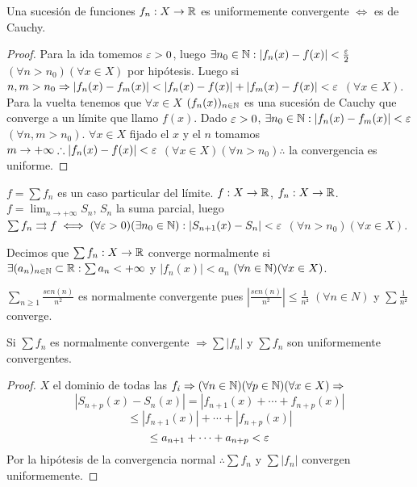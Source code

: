\begin{theorem}
  Una sucesión de funciones $f_n : X \to \mathbb{R}$ es uniformemente convergente $\iff$ es de Cauchy.
  \begin{proof}
    Para la ida tomemos $\varepsilon > 0$, luego $\exists n_0 \in \mathbb{N} : |f_n(x) - f(x)| < \frac{\varepsilon}{2}$ $(\forall n > n_0)(\forall x \in X)$ por hipótesis. Luego si $n, m > n_0 \Rightarrow |f_n(x) - f_m(x)| < |f_n(x) - f(x)| + |f_m(x) - f(x)| < \varepsilon$ $(\forall x \in X)$. \\
    Para la vuelta tenemos que $\forall x \in X$ $(f_n(x))_{n \in \mathbb{N}}$ es una sucesión de Cauchy que converge a un límite que llamo $f(x)$. Dado $\varepsilon > 0$, $\exists n_0 \in \mathbb{N} : |f_n(x) - f_m(x)| < \varepsilon$ $(\forall n, m > n_0)$. $\forall x \in X$ fijado el $x$ y el $n$ tomamos $m \to +\infty \therefore |f_n(x) - f(x)| < \varepsilon$ $(\forall x \in X)(\forall n > n_0) \therefore$ la convergencia es uniforme. 
  \end{proof}
\end{theorem}

$f = \sum f_n$ es un caso particular del límite. $f : X \to \mathbb{R}$, $f_n: X \to \mathbb{R}$. $f = \lim_{n \to +\infty} S_n$, $S_n$ la suma parcial, luego $\sum f_n \rightrightarrows f \iff (\forall \varepsilon > 0)(\exists n_0 \in \mathbb{N}) : |S_{n+1}(x) - S_n| < \varepsilon$ $(\forall n > n_0)(\forall x \in X)$.

\begin{definition}
  Decimos que $\sum f_n: X \to \mathbb{R}$ converge normalmente si $\exists (a_n)_{n \in \mathbb{N}} \subset \mathbb{R} : \sum a_n < +\infty$ y $ |f_n(x)| < a_n$ $(\forall n \in \mathbb{N})(\forall x \in X)$.
\end{definition}

\begin{eg}
  $\sum_{n \geq 1} \frac{sen(n)}{n^2}$ es normalmente convergente pues $|\frac{sen(n)}{n^2}| \leq \frac{1}{n²}$ $(\forall n \in N)$ y $\sum \frac{1}{n²}$ converge.
\end{eg}

\begin{theorem}
  Si $\sum f_n$ es normalmente convergente $\Rightarrow \sum |f_n|$ y $\sum f_n$ son uniformemente convergentes.
  \begin{proof}
    $X$ el dominio de todas las $f_i \Rightarrow (\forall n \in \mathbb{N})(\forall p \in \mathbb{N})(\forall x \in X) \Rightarrow$ \begin{equation}
      |S_{n + p}(x) - S_n(x)| = |f_{n+1}(x) + \cdots + f_{n + p}(x)|
    \end{equation}
    \begin{equation}
      \leq |f_{n+1}(x)| + \cdots + |f_{n+p}(x)|
    \end{equation}
    \begin{equation}
      \leq a_{n+1} + \cdots + a_{n+p} < \varepsilon
    \end{equation}
    Por la hipótesis de la convergencia normal $\therefore \sum f_n$ y $\sum |f_n|$ convergen uniformemente.
  \end{proof}
\end{theorem}

